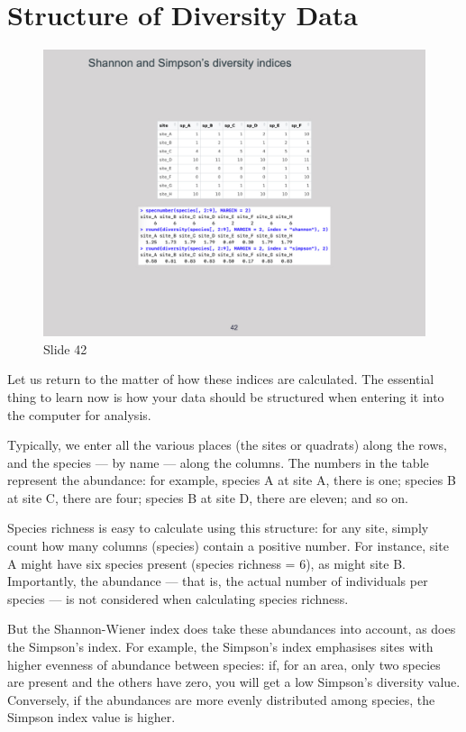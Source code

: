 \documentclass[
  10pt,
]{book}
\begin{document}
\section{Structure of Diversity Data}\label{structure-of-diversity-data}

\begin{figure}[ht]
\centering
\includegraphics[width=0.8\linewidth]{../images/BDC334/BDC334-042.jpeg}
\caption*{Slide 42}
\end{figure}

Let us return to the matter of how these indices are calculated. The
essential thing to learn now is how your data should be structured when
entering it into the computer for analysis.

Typically, we enter all the various places (the sites or quadrats) along
the rows, and the species --- by name --- along the columns. The numbers
in the table represent the abundance: for example, species A at site A,
there is one; species B at site C, there are four; species B at site D,
there are eleven; and so on.

Species richness is easy to calculate using this structure: for any
site, simply count how many columns (species) contain a positive number.
For instance, site A might have six species present (species richness =
\(6\)), as might site B. Importantly, the abundance --- that is, the
actual number of individuals per species --- is not considered when
calculating species richness.

But the Shannon-Wiener index does take these abundances into account, as
does the Simpson's index. For example, the Simpson's index emphasises
sites with higher evenness of abundance between species: if, for an
area, only two species are present and the others have zero, you will
get a low Simpson's diversity value. Conversely, if the abundances are
more evenly distributed among species, the Simpson index value is
higher.
\end{document}
